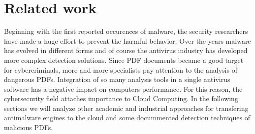\chapter{Related work}
\label{chapter:relatedWork}
Beginning with the first reported occurences of malware, the security researchers have made a huge effort to prevent the harmful behavior. Over the years malware has evolved in different forms and of course the antivirus industry has developed more complex detection solutions. Since PDF documents became a good target for cybercriminals, more and more specialists pay attention to the analysis of dangerous PDFs. Integration of so many analysis tools in a single antivirus software has a negative impact on computers performance. For this reason, the cybersecurity field attaches importance to Cloud Computing. In the following sections we will analyze other academic and industrial approaches for transfering antimalware engines to the cloud and some docummented detection techniques of malicious PDFs.


